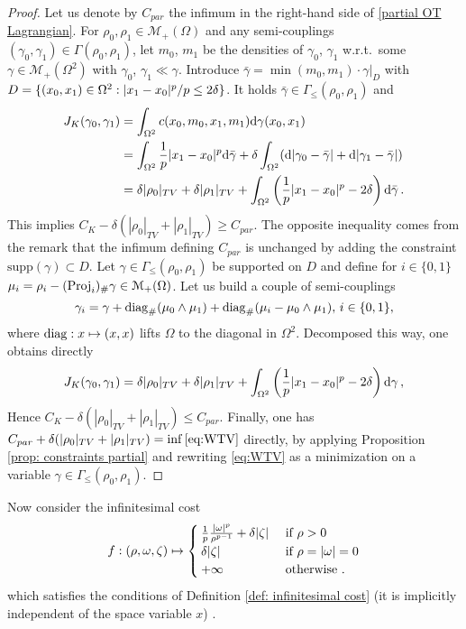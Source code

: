 \begin{proof}
Let us denote by $C_{par}$ the infimum in the right-hand side of \eqref{partial OT Lagrangian}.
%
For $\rho_0, \rho_1 \in \mathcal{M}_+(\Omega)$ and any semi-couplings $(\gamma_0,\gamma_1)\in \Gamma(\rho_0,\rho_1)$, let $m_0$, $m_1$ be the densities of $\gamma_0$, $\gamma_1$ w.r.t.\ some $\gamma \in \mathcal{M}_+(\Omega^2)$ with $\gamma_0$, $\gamma_1 \ll \gamma$. Introduce $\bar{\gamma}=\min (m_0,m_1) \cdot \gamma|_{D}$ with $D=\{(x_0,x_1)\in \Omega^2 : |x_1-x_0|^p/p\leq 2 \delta \}$. It holds $\bar{\gamma} \in \Gamma_{\leq}(\rho_0,\rho_1)$ and
\begin{align*}
J_K(\gamma_0,\gamma_1) &= \int_{\Omega^2} c(x_0,m_0,x_1,m_1) \mathrm{d} \gamma(x_0,x_1) \\
&= \int_{\Omega^2} \frac1p |x_1-x_0|^p \mathrm{d} \bar{\gamma} + \delta \int_{\Omega^2} (\mathrm{d} |\gamma_0-\bar{\gamma} | + \mathrm{d} |\gamma_1-\bar{\gamma}|) \\
&= \delta |\rho_0|_{TV}+ \delta |\rho_1|_{TV} + \int_{\Omega^2} \left(\frac1p |x_1-x_0|^p -2\delta \right) \mathrm{d} \bar{\gamma} \, .
\end{align*}
This implies $C_K -\delta (|\rho_0|_{TV}+|\rho_1|_{TV}) \geq C_{par}$.
%
The opposite inequality comes from the remark that the infimum defining $C_{par}$ is unchanged by adding the constraint $\text{supp} (\gamma)\subset D$. 
%
Let $\gamma \in \Gamma_{\leq}(\rho_0,\rho_1)$ be supported on $D$ and define for $i\in \{0,1\}$ $\mu_i =\rho_i-(\operatorname{Proj}_i )_\# \gamma \in \mathcal{M}_+(\Omega)$. Let us build a couple of semi-couplings 
\[
\gamma_i = \gamma + \operatorname{diag}_\# (\mu_0\wedge \mu_1) + \operatorname{diag}_\# (\mu_i- \mu_0 \wedge \mu_1), \, i \in \{0,1\},
\]
where $\operatorname{diag} : x \mapsto (x,x)$ lifts $\Omega$ to the diagonal in $\Omega^2$. Decomposed this way, one obtains directly
\[
J_K(\gamma_0,\gamma_1) = \delta |\rho_0|_{TV}+ \delta |\rho_1|_{TV} + \int_{\Omega^2} \left(\frac1p |x_1-x_0|^p -2\delta \right) \mathrm{d} \gamma \, ,
\]
Hence $C_K -\delta (|\rho_0|_{TV}+|\rho_1|_{TV}) \leq C_{par}$. Finally, one has $C_{par} + \delta (|\rho_0|_{TV}+|\rho_1|_{TV}) = \inf \eqref{eq:WTV}$ directly, by applying Proposition \ref{prop: constraints partial} and rewriting \eqref{eq:WTV} as a minimization on a variable $\gamma \in \Gamma_{\leq}(\rho_0,\rho_1)$.
\end{proof}

Now consider the infinitesimal cost
\begin{align}
\label{eq:POT dynamic cost}
f : (\rho,\omega,\zeta) \mapsto 
\begin{cases}
\frac1p \frac{|\omega|^p}{\rho^{p-1}} + \delta |\zeta| & \textnormal{ if } \rho>0 \\
\delta |\zeta|  & \textnormal{ if } \rho = |\omega| =0 \\
+ \infty & \textnormal{ otherwise .}
\end{cases}
\end{align}
which satisfies the conditions of Definition \ref{def: infinitesimal cost} (it is implicitly independent of the space variable $x$) .


